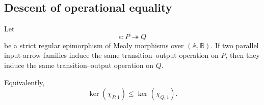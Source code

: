\subsection{Descent of operational equality}
\label{subsec:to-operational-descent}

\begin{proposition}
\label{prop:to-operational-descent}
    Let
    \[
        e:P\twoheadrightarrow Q
    \]
    be a strict regular epimorphism of Mealy morphisms over
    \((\mathbb A,\mathbb B)\). If two parallel input-arrow families induce the
    same transition--output operation on \(P\), then they induce the same
    transition--output operation on \(Q\).

    Equivalently,
    \[
        \ker(\chi_{P,1})
        \leq
        \ker(\chi_{Q,1}).
    \]
\end{proposition}

